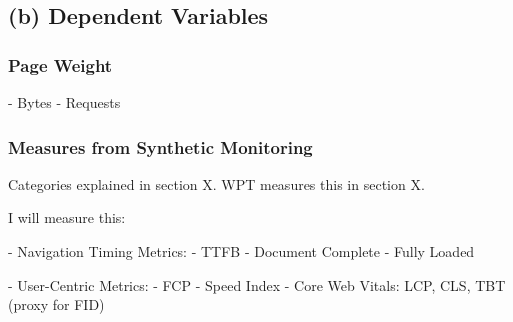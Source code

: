 








\subsection{(b) Dependent Variables}


\subsubsection{Page Weight}

	- Bytes
	- Requests

\subsubsection{Measures from Synthetic Monitoring}

Categories explained in section X.
WPT measures this in section X.

I will measure this:

- Navigation Timing Metrics:
	- TTFB
	- Document Complete
	- Fully Loaded
	
- User-Centric Metrics:
	- FCP
	- Speed Index
	- Core Web Vitals: LCP, CLS, TBT (proxy for FID)

